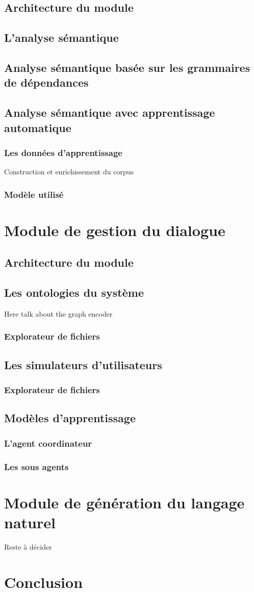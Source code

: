 	\subsection{Architecture du module}
	\subsection{L'analyse sémantique}
	\subsection{Analyse sémantique basée sur les grammaires de dépendances}
	\subsection{Analyse sémantique avec apprentissage automatique}
		\subsubsection{Les données d'apprentissage}
		Construction et enrichissement du corpus 
		\subsubsection{Modèle utilisé}
	
	
\section{Module de gestion du dialogue}
	\subsection{Architecture du module}
	\subsection{Les ontologies du système}
		Here talk about the graph encoder 
		\subsubsection*{Explorateur de fichiers}
	\subsection{Les simulateurs d'utilisateurs}
		\subsubsection*{Explorateur de fichiers}
	\subsection{Modèles d'apprentissage}
		\subsubsection*{L'agent coordinateur}
		\subsubsection*{Les sous agents}

\section{Module de génération du langage naturel}
	Reste à décider
\section{Conclusion}	